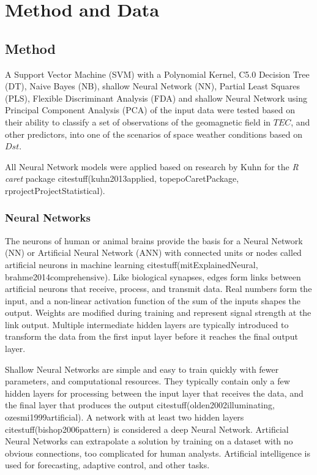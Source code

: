 \documentclass[preprint,12pt]{elsarticle}
\begin{document}
\section{Method and Data}

\subsection{Method}

A Support Vector Machine (SVM) with a Polynomial Kernel, C5.0 Decision Tree (DT), Naive Bayes (NB), shallow Neural Network (NN), Partial Least Squares (PLS), Flexible Discriminant Analysis (FDA) and shallow Neural Network using Principal Component Analysis (PCA) of the input data were tested based on their ability to classify a set of observations of the geomagnetic field in $TEC$, and other predictors, into one of the scenarios of space weather conditions based on $Dst$.

All Neural Network models were applied based on research by Kuhn for the \textit{R} \textit{caret} package citestuff(kuhn2013applied, topepoCaretPackage, rprojectProjectStatistical).

\subsubsection{Neural Networks}

The neurons of human or animal brains provide the basis for a Neural Network (NN) or Artificial Neural Network (ANN) with connected units or nodes called artificial neurons in machine learning citestuff(mitExplainedNeural, brahme2014comprehensive). Like biological synapses, edges form links between artificial neurons that receive, process, and transmit data. Real numbers form the input, and a non-linear activation function of the sum of the inputs shapes the output. Weights are modified during training and represent signal strength at the link output. Multiple intermediate hidden layers are typically introduced to transform the data from the first input layer before it reaches the final output layer. 

Shallow Neural Networks are simple and easy to train quickly with fewer parameters, and computational resources. They typically contain only a few hidden layers for processing between the input layer that receives the data, and the final layer that produces the output citestuff(olden2002illuminating, ozesmi1999artificial).  A network with at least two hidden layers citestuff(bishop2006pattern) is considered a deep Neural Network. Artificial Neural Networks can extrapolate a solution by training on a dataset with no obvious connections, too complicated for human analysts. Artificial intelligence is used for forecasting, adaptive control, and other tasks.
\end{document}
